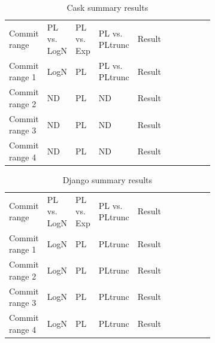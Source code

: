 \documentclass[conference]{IEEEtran}
\begin{document}
\begin{table}[h!tbp]
	\caption{Cask summary results}
	\begin{center}
		\begin{tabular}{| p{0.12\linewidth} | p{0.08\linewidth} | p{0.08\linewidth} | p{0.08\linewidth} | p{0.1\linewidth} |p{0.13\linewidth} | p{0.09\linewidth} |}
			\hline
                  Commit range & PL vs. LogN & PL vs. Exp & PL vs. PLtrunc & Result \\
                  Commit range 1 &  LogN & PL  & PL vs. PLtrunc & Result \\
                  Commit range 2& ND & PL  & ND & Result \\
                  Commit range 3& ND  &  PL & ND & Result \\
                  Commit range 4& ND & PL  & ND & Result \\
			\hline

			\hline
		\end{tabular}
	\end{center}
\label{tab:2019testscask}
\end{table}

\begin{table}[h!tbp]
	\caption{Django summary results}
	\begin{center}
		\begin{tabular}{| p{0.12\linewidth} | p{0.08\linewidth} | p{0.08\linewidth} | p{0.08\linewidth} | p{0.1\linewidth} |p{0.13\linewidth} | p{0.09\linewidth} |}
			\hline
                  Commit range & PL vs. LogN & PL vs. Exp & PL vs. PLtrunc & Result \\
                  Commit range 1 &  LogN & PL  &PLtrunc & Result \\
                  Commit range 2&  LogN & PL  &PLtrunc & Result \\
                  Commit range 3&  LogN & PL  &PLtrunc & Result \\
                  Commit range 4&  LogN & PL  &PLtrunc & Result \\
			\hline

			\hline
		\end{tabular}
	\end{center}
\label{tab:2019testsdjango}
\end{table}
\end{document}

